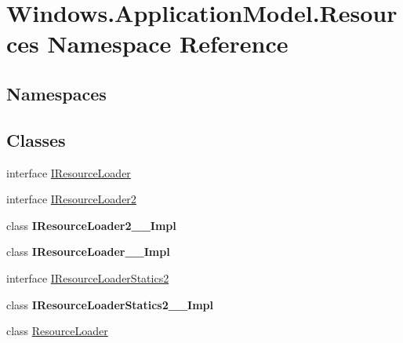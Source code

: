 \hypertarget{namespace_windows_1_1_application_model_1_1_resources}{}\section{Windows.\+Application\+Model.\+Resources Namespace Reference}
\label{namespace_windows_1_1_application_model_1_1_resources}
\subsection*{Namespaces}
\begin{DoxyCompactItemize}
\end{DoxyCompactItemize}
\subsection*{Classes}
\begin{DoxyCompactItemize}
\item 
interface \hyperlink{interface_windows_1_1_application_model_1_1_resources_1_1_i_resource_loader}{I\+Resource\+Loader}
\item 
interface \hyperlink{interface_windows_1_1_application_model_1_1_resources_1_1_i_resource_loader2}{I\+Resource\+Loader2}
\item 
class {\bfseries I\+Resource\+Loader2\+\_\+\+\_\+\+Impl}
\item 
class {\bfseries I\+Resource\+Loader\+\_\+\+\_\+\+Impl}
\item 
interface \hyperlink{interface_windows_1_1_application_model_1_1_resources_1_1_i_resource_loader_statics2}{I\+Resource\+Loader\+Statics2}
\item 
class {\bfseries I\+Resource\+Loader\+Statics2\+\_\+\+\_\+\+Impl}
\item 
class \hyperlink{class_windows_1_1_application_model_1_1_resources_1_1_resource_loader}{Resource\+Loader}
\end{DoxyCompactItemize}

